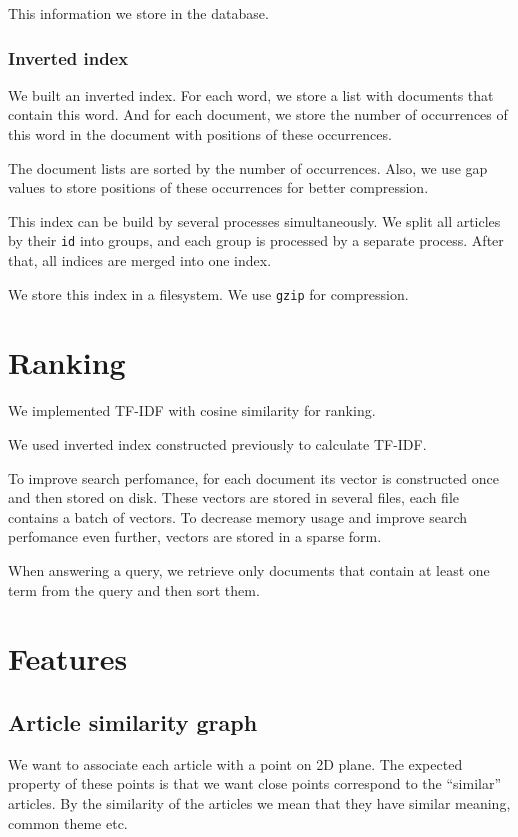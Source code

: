 This information we store in the database.

\subsubsection{Inverted index}
We built an inverted index. For each word, we store a list with documents that contain this word. And for each document, we store the number of occurrences of this word in the document with positions of these occurrences.

The document lists are sorted by the number of occurrences. Also, we use gap values to store positions of these occurrences for better compression.

This index can be build by several processes simultaneously. We split all articles by their \texttt{id} into groups, and each group is processed by a separate process. After that, all indices are merged into one index.

We store this index in a filesystem. We use \texttt{gzip} for compression.

\section{Ranking}
We implemented TF-IDF with cosine similarity for ranking.

We used inverted index constructed previously to calculate TF-IDF. 

To improve search perfomance, for each document its vector is constructed once and then stored on disk. 
These vectors are stored in several files, each file contains a batch of vectors.
To decrease memory usage and improve search perfomance even further, vectors are stored in a sparse form.

When answering a query, we retrieve only documents that contain at least one term from the query and then sort them.


\section{Features}
\subsection{Article similarity graph}
We want to associate each article with a point on 2D plane.
The expected property of these points is that we want close points correspond to the ``similar'' articles.
By the similarity of the articles we mean that they have similar meaning, common theme etc.

